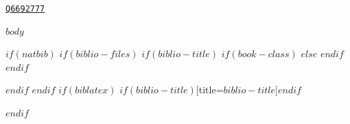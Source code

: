 \documentclass[
    a5paper,pagesize,
    10pt,
    DIV=12, %
    BCOR=2mm,
    open=any, %
    ngerman
]{scrbook}
\begin{document}
\pagebreak
\thispagestyle{empty}
\begin{center}
\vspace*{3cm}
{\ttfamily \href{https://www.wikidata.org/wiki/Q6692777}{\texttt{Q6692777}}}
\end{center}


{
\hypersetup{linkcolor=black}
\setcounter{tocdepth}{$toc-depth$}
\renewcommand{\contentsname}{Inhaltsverzeichnis}
\renewcommand{\listfigurename}{Abbildungsverzeichnis}
\tableofcontents
\listoffigures
}

$body$

$if(natbib)$
$if(biblio-files)$
$if(biblio-title)$
$if(book-class)$
\renewcommand\bibname{$biblio-title$}
$else$
\renewcommand\refname{$biblio-title$}
$endif$
$endif$


$endif$
$endif$
$if(biblatex)$
\printbibliography$if(biblio-title)$[title=$biblio-title$]$endif$

$endif$

\pagebreak
\thispagestyle{empty}
\end{document}
